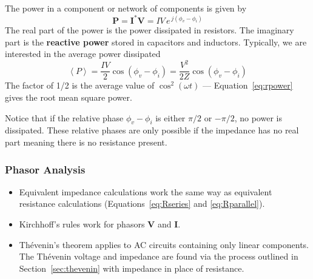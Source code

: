 \documentclass[11pt]{article}
\begin{document}
The power in a component or network of components is given by
\begin{equation}
  \mathbf{P} = \mathbf{I^*V} = IV \, e^{\,j(\phi_v - \phi_i)}
  \label{eq:complexpower}
\end{equation}
The real part of the power is the power dissipated in resistors. The
imaginary part is the \textbf{reactive power} stored in capacitors and
inductors. Typically, we are interested in the average power
dissipated
\begin{equation}
  \left< P \right> = \frac{IV}{2} \cos(\phi_v - \phi_i) =
  \frac{V^2}{2Z} \cos(\phi_v - \phi_i)
  \label{eq:rpower}
\end{equation}
The factor of 1/2 is the average value of $\cos^2(\omega t)$ ---
Equation~\ref{eq:rpower} gives the root mean square power.

Notice that if the relative phase $\phi_v - \phi_i$ is either $\pi/2$
or $-\pi/2$, no power is dissipated. These relative phases are only
possible if the impedance has no real part meaning there is no
resistance present.


\begin{latexonly}
  \noindent
  \hrulefill
\end{latexonly}
\htmlrule
\subsubsection*{Phasor Analysis}
\begin{itemize}
\item Equivalent impedance calculations work the same way as
  equivalent resistance calculations (Equations~\ref{eq:Rseries} and
  \ref{eq:Rparallel}).

\item Kirchhoff's rules work for phasors $\mathbf{V}$ and
  $\mathbf{I}$.

\item Th\'{e}venin's theorem applies to AC circuits containing only
  linear components. The Th\'{e}venin voltage and impedance are found
  via the process outlined in Section~\ref{sec:thevenin} with
  impedance in place of resistance.
\end{itemize}
\begin{latexonly}
  \noindent
  \hrulefill
\end{latexonly}
\htmlrule
\end{document}
